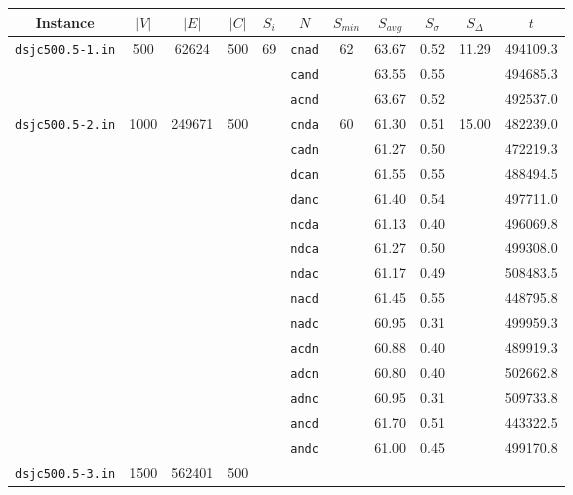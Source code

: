 \documentclass[paper = a4, fontsize = 10pt]{scrartcl}
\begin{document}
\singlespacing
\begin{table}[h]
\centering
\begin{tabular}{|c|ccc|c|c|ccc|c|c|}
\hline
Instance & \multicolumn{1}{c}{$|V|$} & \multicolumn{1}{c}{$|E|$} & \multicolumn{1}{c|}{$|C|$} & \multicolumn{1}{c|}{$S_i$} & \multicolumn{1}{c|}{$N$} & $S_{min}$ & \multicolumn{1}{c}{$S_{avg}$} & \multicolumn{1}{c|}{$S_{\sigma}$} & \multicolumn{1}{c|}{$S_{\Delta}$} & \multicolumn{1}{c|}{$t$} \\
\hline\hline

\multirow{3}{*}{\texttt{dsjc500.5-1.in}} & \multirow{3}{*}{500} & \multirow{3}{*}{62624} & \multirow{3}{*}{500} & \multirow{32}{*}{69} &
      \texttt{cnad}	& \multirow{3}{*}{62}	& 63.67	& 0.52	& \multirow{3}{*}{11.29}	& 494109.3\\
&&&&& \texttt{cand}	&			& 63.55	& 0.55	&				& 494685.3\\
&&&&& \texttt{acnd}	&			& 63.67	& 0.52	&				& 492537.0\\
\cline{1-4}\cline{6-11}
\multirow{14}{*}{\texttt{dsjc500.5-2.in}} & \multirow{14}{*}{1000} & \multirow{14}{*}{249671} & \multirow{14}{*}{500} & &
      \texttt{cnda}	& \multirow{14}{*}{60}	& 61.30	& 0.51	& \multirow{14}{*}{15.00}	& 482239.0\\
&&&&& \texttt{cadn}	&			& 61.27	& 0.50	&				& 472219.3\\
&&&&& \texttt{dcan}	&			& 61.55	& 0.55	&				& 488494.5\\
&&&&& \texttt{danc}	&			& 61.40	& 0.54	&				& 497711.0\\
&&&&& \texttt{ncda}	&			& 61.13	& 0.40	&				& 496069.8\\
&&&&& \texttt{ndca}	&			& 61.27	& 0.50	&				& 499308.0\\
&&&&& \texttt{ndac}	&			& 61.17	& 0.49	&				& 508483.5\\
&&&&& \texttt{nacd}	&			& 61.45	& 0.55	&				& 448795.8\\
&&&&& \texttt{nadc}	&			& 60.95	& 0.31	&				& 499959.3\\
&&&&& \texttt{acdn}	&			& 60.88	& 0.40	&				& 489919.3\\
&&&&& \texttt{adcn}	&			& 60.80	& 0.40	&				& 502662.8\\
&&&&& \texttt{adnc}	&			& 60.95	& 0.31	&				& 509733.8\\
&&&&& \texttt{ancd}	&			& 61.70	& 0.51	&				& 443322.5\\
&&&&& \texttt{andc}	&			& 61.00	& 0.45	&				& 499170.8\\
\cline{1-4}\cline{6-11}
\multirow{14}{*}{\texttt{dsjc500.5-3.in}} & \multirow{14}{*}{1500} & \multirow{14}{*}{562401} & \multirow{14}{*}{500} & &

\end{tabular}
\end{table}
\end{document}
